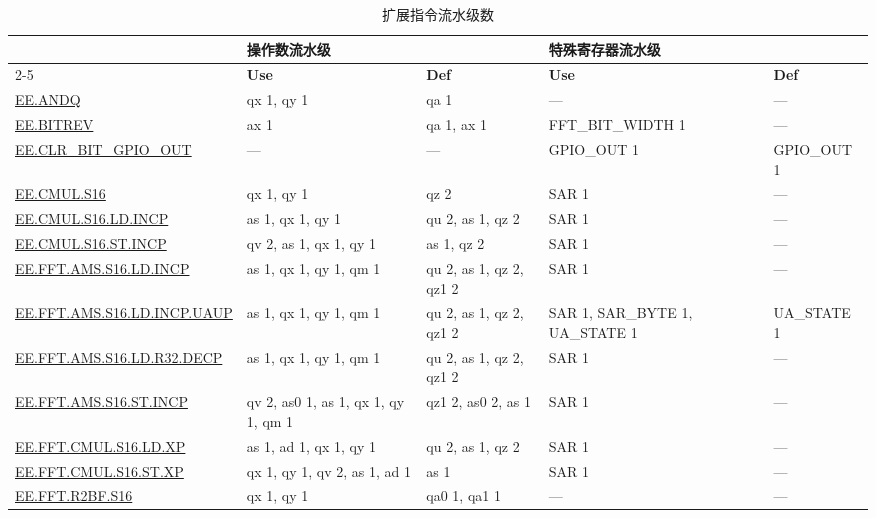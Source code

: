 
\begin{longtable}[c]{|l|m{2.5cm}|m{2.5cm}|m{2.5cm}|m{2.5cm}|}
    \caption{扩展指令流水级数}
    \label{tab:pie_inst_pipelining}\\
    \hline
    \rowcolor{lightgray}
     & \multicolumn{2}{l|}{\textbf{操作数流水级}} & \multicolumn{2}{l|}{\textbf{特殊寄存器流水级}} \\\cline{2-5}
    \rowcolor{lightgray}
    \multirow{-2}{1in}{\textbf{指令}} & \textbf{Use} & \textbf{Def} & \textbf{Use} & \textbf{Def} \\\hline
    \hyperref[instruction:EEANDQ]{EE.ANDQ} & qx 1, qy 1 & qa 1 & — & — \\\hline
    \hyperref[instruction:EEBITREV]{EE.BITREV} & ax 1 & qa 1, ax 1 & FFT\_BIT\_WIDTH 1 & — \\\hline
    \hyperref[instruction:EECLRBITGPIOOUT]{EE.CLR\_BIT\_GPIO\_OUT} & — & — & GPIO\_OUT 1 & GPIO\_OUT 1 \\\hline
    \hyperref[instruction:EECMULS16]{EE.CMUL.S16} & qx 1, qy 1 & qz 2 & SAR 1 & — \\\hline
    \hyperref[instruction:EECMULS16LDINCP]{EE.CMUL.S16.LD.INCP} & as 1, qx 1, qy 1 & qu 2, as 1, qz 2 & SAR 1 & — \\\hline
    \hyperref[instruction:EECMULS16STINCP]{EE.CMUL.S16.ST.INCP} & qv 2, as 1, qx 1, qy 1 & as 1, qz 2 & SAR 1 & — \\\hline
    \hyperref[instruction:EEFFTAMSS16LDINCP]{EE.FFT.AMS.S16.LD.INCP} & as 1, qx 1, qy 1, qm 1 & qu 2, as 1, qz 2, qz1 2 & SAR 1 & — \\\hline
    \hyperref[instruction:EEFFTAMSS16LDINCPUAUP]{EE.FFT.AMS.S16.LD.INCP.UAUP} & as 1, qx 1, qy 1, qm 1 & qu 2, as 1, qz 2, qz1 2 & SAR 1, SAR\_BYTE 1, UA\_STATE 1 & UA\_STATE 1\\\hline
    \hyperref[instruction:EEFFTAMSS16LDR32DECP]{EE.FFT.AMS.S16.LD.R32.DECP} & as 1, qx 1, qy 1, qm 1 & qu 2, as 1, qz 2, qz1 2 & SAR 1 & — \\\hline
    \hyperref[instruction:EEFFTAMSS16STINCP]{EE.FFT.AMS.S16.ST.INCP} & qv 2, as0 1, as 1, qx 1, qy 1, qm 1 & qz1 2, as0 2, as 1 & SAR 1 & — \\\hline
    \hyperref[instruction:EEFFTCMULS16LDXP]{EE.FFT.CMUL.S16.LD.XP} & as 1, ad 1, qx 1, qy 1 & qu 2, as 1, qz 2 & SAR 1 & — \\\hline
    \hyperref[instruction:EEFFTCMULS16STXP]{EE.FFT.CMUL.S16.ST.XP} & qx 1, qy 1, qv 2, as 1, ad 1 & as 1 & SAR 1 & — \\\hline
    \hyperref[instruction:EEFFTR2BFS16]{EE.FFT.R2BF.S16} & qx 1, qy 1 & qa0 1, qa1 1 & — & — \\\hline

\end{longtable}
